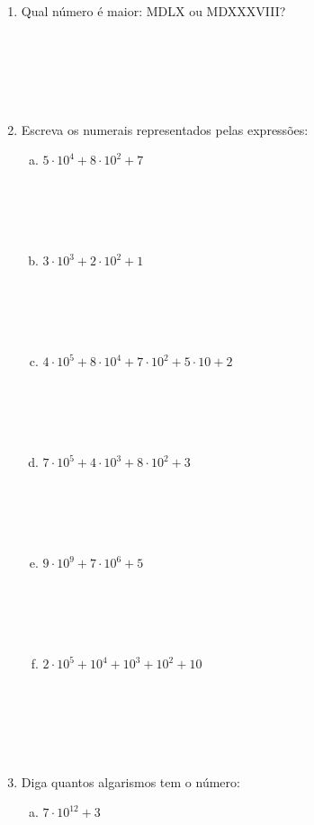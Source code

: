 \documentclass[a4paper,14pt]{article}
\begin{document}
\begin{multicols}{2}
\begin{enumerate}
			\item Qual número é maior: MDLX ou MDXXXVIII?  \\\\\\\\\\\\
			\item Escreva os numerais representados pelas expressões:
			\begin{enumerate}[a)]
				\item $5 \cdot 10^4 + 8 \cdot 10^2 + 7$ \\\\\\\\\\
				\item $3 \cdot 10^3 + 2 \cdot 10^2 + 1$ \\\\\\\\\\
				\item $4 \cdot 10^5 + 8 \cdot 10^4 + 7 \cdot 10^2 + 5 \cdot 10 + 2$ \\\\\\\\\\
				\item $7 \cdot 10^5 + 4 \cdot 10^3 + 8 \cdot 10^2 + 3$ \\\\\\\\\\
				\item $9 \cdot 10^9 + 7 \cdot 10^6 + 5$ \\\\\\\\\\
				\item $2 \cdot 10^5 + 10^4 + 10^3 + 10^2 + 10$ \\\\\\\\\\\\
			\end{enumerate}
			\item Diga quantos algarismos tem o número:
			\begin{enumerate}[a)]
				\item $7 \cdot 10^12 + 3$ \\\\\\\\\\

\end{enumerate}
\end{enumerate}
\end{multicols}
\end{document}
